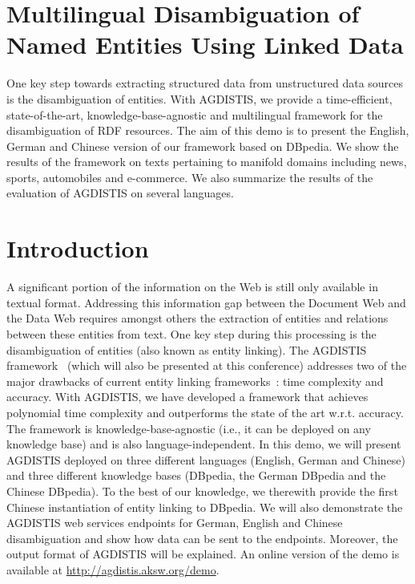 


\section{Multilingual Disambiguation of Named Entities Using Linked Data}




One key step towards extracting structured data from unstructured data sources is the disambiguation of entities.
With AGDISTIS, we provide a time-efficient, state-of-the-art, knowledge-base-agnostic and multilingual framework for the disambiguation of RDF resources.
The aim of this demo is to present the English, German and Chinese version of our framework based on DBpedia.
We show the results of the framework on texts pertaining to manifold domains including news, sports, automobiles and e-commerce.
We also summarize the results of the evaluation of AGDISTIS on several languages.

\section{Introduction}
A significant portion of the information on the Web is still only available in textual format. 
Addressing this information gap between the Document Web and the Data Web requires amongst others the extraction of entities and relations between these entities from text.
One key step during this processing is the disambiguation of entities (also known as entity linking).
The AGDISTIS framework~\cite{AGDISTIS_ISWC} (which will also be presented at this conference) addresses two of the major drawbacks of current entity linking frameworks~\cite{TagMe2,spotlight,babelfy}: time complexity and accuracy.
With AGDISTIS, we have developed a framework that achieves polynomial time complexity and outperforms the state of the art w.r.t. accuracy.
The framework is knowledge-base-agnostic (i.e., it can be deployed on any knowledge base) and is also language-independent.
In this demo, we will present AGDISTIS deployed on three different languages (English, German and Chinese) and three different knowledge bases (DBpedia, the German DBpedia and the Chinese DBpedia).
To the best of our knowledge, we therewith provide the first Chinese instantiation of entity linking to DBpedia.
We will also demonstrate the AGDISTIS web services endpoints for German, English and Chinese disambiguation and show how data can be sent to the endpoints.
Moreover, the output format of AGDISTIS will be explained.
An online version of the demo is available at \url{http://agdistis.aksw.org/demo}.

